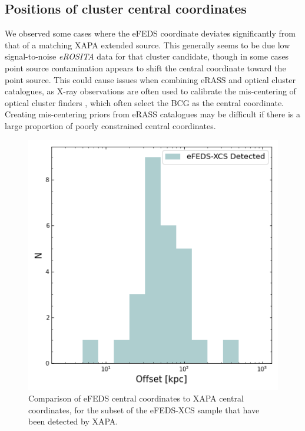 \documentclass[fleqn,usenatbib]{mnras}
\begin{document}
\subsection{Positions of cluster central coordinates}
We observed some cases where the eFEDS coordinate deviates significantly from that of a matching XAPA extended source. This generally seems to be due low signal-to-noise {\em eROSITA} data for that cluster candidate, though in some cases point source contamination appears to shift the central coordinate toward the point source. This could cause issues when combining eRASS and optical cluster catalogues, as X-ray observations are often used to calibrate the mis-centering of optical cluster finders \citep[][]{desmiscentering}, which often select the BCG as the central coordinate. Creating mis-centering priors from eRASS catalogues may be difficult if there is a large proportion of poorly constrained central coordinates.

\begin{figure}
    \centering
    \includegraphics[width=0.95\columnwidth]{images/eFEDS_XAPA_offset.png}
    \caption[]{Comparison of eFEDS central coordinates to XAPA central coordinates, for the subset of the eFEDS-XCS sample that have been detected by XAPA.}
    \label{fig:centcoords}
\end{figure}
\end{document}
